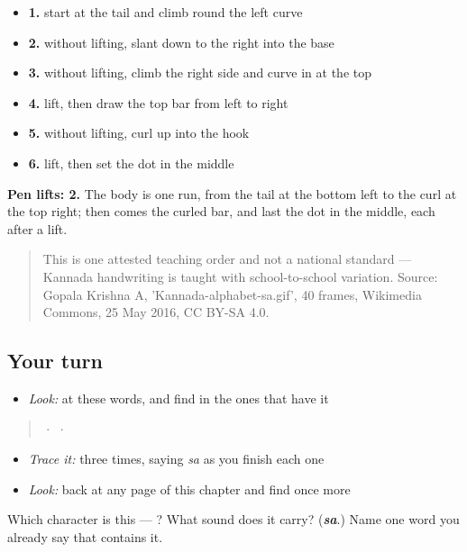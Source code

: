 \begin{itemize}
\raggedright
  \item \textbf{1.} start at the tail and climb round the left curve
  \item \textbf{2.} without lifting, slant down to the right into the base
  \item \textbf{3.} without lifting, climb the right side and curve in at the top
  \item \textbf{4.} lift, then draw the top bar from left to right
  \item \textbf{5.} without lifting, curl up into the hook
  \item \textbf{6.} lift, then set the dot in the middle
\end{itemize}

\textbf{Pen lifts: 2.} The body is one run, from the tail at the bottom left to the curl at the top right; then comes the curled bar, and last the dot in the middle, each after a lift.

\begin{quote}
This is one attested teaching order and not a national standard — Kannada handwriting is taught with school-to-school variation. Source: Gopala Krishna A, 'Kannada-alphabet-sa.gif', 40 frames, Wikimedia Commons, 25 May 2016, CC BY-SA 4.0.
\end{quote}

\subsection*{Your turn}
\begin{itemize}
\raggedright
  \item \emph{Look:} at these words, and find  in the ones that have it
\end{itemize}

\begin{quote}
  ·    ·  
\end{quote}

\begin{itemize}
\raggedright
  \item \emph{Trace it:}  three times, saying \emph{sa} as you finish each one
  \item \emph{Look:} back at any page of this chapter and find  once more
\end{itemize}

\begin{tcolorbox}[breakable,colback=teal!4,colframe=teal!35!black,title={Before you move on}]
Which character is this — ? What sound does it carry? (\emph{\textbf{sa}}.) Name one word you already say that contains it.
\end{tcolorbox}
